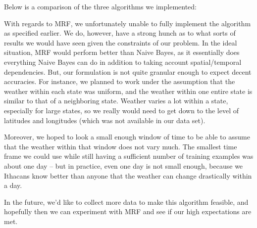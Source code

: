 	Below is a comparison of the three algorithms we implemented: 

\begin{figure}[H]
\noindent{}
\end{figure}


	With regards to MRF, we unfortunately unable to fully implement the algorithm as specified earlier. We do, however, have a strong hunch as to what sorts of results we would have seen given the constraints of our problem. In the ideal situation, MRF would perform better than Naive Bayes, as it essentially does everything Naive Bayes can do in addition to taking account spatial/temporal dependencies. But, our formulation is not quite granular enough to expect decent accuracies. For instance, we planned to work under the assumption that the weather within each state was uniform, and the weather within one entire state is similar to that of a neighboring state. Weather varies a lot within a state, especially for large states, so we really would need to get down to the level of latitudes and longitudes (which was not available in our data set).

	Moreover, we hoped to look a small enough window of time to be able to assume that the weather within that window does not vary much. The smallest time frame we could use while still having a sufficient number of training examples was about one day -- but in practice, even one day is not small enough, because we Ithacans know better than anyone that the weather can change drastically within a day. 

	In the future, we'd like to collect more data to make this algorithm feasible, and hopefully then we can experiment with MRF and see if our high expectations are met. 
